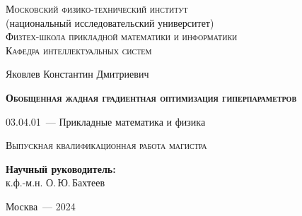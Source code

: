 \thispagestyle{empty}

\begin{titlepage}
    \begin{center}
        \textsc{Московский физико-технический институт}\\
        (национальный исследовательский университет)\\
        \textsc{Физтех-школа прикладной математики и информатики}\\
        \textsc{Кафедра интеллектуальных систем}
    \end{center}
    \vspace{2.5cm}
    \begin{center}
        {Яковлев Константин Дмитриевич}
        \par
        \vspace{2cm}
        {\Large \textsc{\textbf{Обобщенная жадная градиентная оптимизация гиперпараметров}}}
        \par
        \vspace{2cm}
        {03.04.01~--- Прикладные математика и физика}
        \par
        \vspace{2cm}
        \textsc{Выпускная квалификационная работа магистра}
    \end{center}
    \vspace{2cm}
    \hfill\parbox{8,4cm}{\textbf{Научный руководитель:}
    \\к.ф.-м.н. О.\,Ю.\,Бахтеев}
    \par
    \vspace{2cm}
    \begin{center}
        {Москва~--- 2024}
    \end{center}
\end{titlepage}